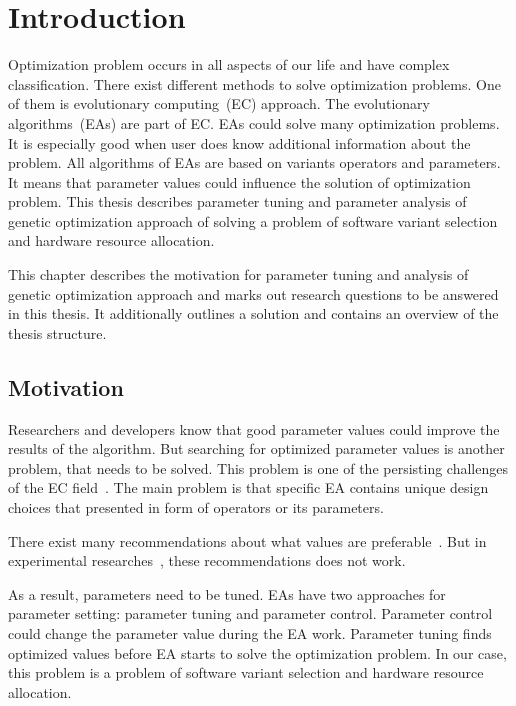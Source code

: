 \chapter{Introduction}\label{intro}
Optimization problem occurs in all aspects of our life and have complex classification. There exist different methods to solve optimization problems. One of them is evolutionary computing~(EC) approach. The evolutionary algorithms~(EAs) are part of EC. EAs could solve many optimization problems. It is especially good when user does know additional information about the problem. All algorithms of EAs are based on variants operators and parameters. It means that parameter values could influence the solution of optimization problem. This thesis describes parameter tuning and parameter analysis of genetic optimization approach of solving a problem of software variant selection and hardware resource allocation.  

This chapter describes the motivation for parameter tuning and analysis of genetic optimization approach and marks out research questions to be answered in this thesis. It additionally outlines a solution and contains an overview of the thesis structure.

\section{Motivation}
Researchers and developers know that good parameter values could improve the results of the algorithm. But searching for optimized parameter values is another problem, that needs to be solved. This problem is one of the persisting challenges of the EC field~\cite{smit2010parameter}. The main problem is that specific EA contains unique design choices that presented in form of operators or its parameters. 

There exist many recommendations about what values are preferable~\cite{de2007parameter, sipper2018investigating}.  But in experimental researches~\cite{de2007parameter, shahookar1990genetic, gockel1997influencing}, these recommendations does not work. 

As a result, parameters need to be tuned. EAs have two approaches for parameter setting: parameter tuning and parameter control. Parameter control could change the parameter value during the EA work. Parameter tuning finds optimized values before EA starts to solve the optimization problem. In our case, this problem is a problem of software variant selection and hardware resource allocation. 

